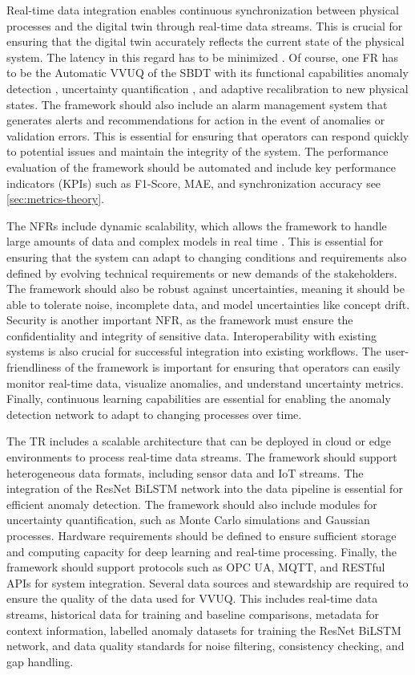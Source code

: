 Real-time data integration enables continuous synchronization between physical processes and the digital twin through real-time data streams. This is crucial for ensuring that the digital twin accurately reflects the current state of the physical system. The latency in this regard has to be minimized \autocite{li2018learning}. Of course, one FR has to be the Automatic VVUQ of the SBDT with its functional capabilities anomaly detection \autocite{pang2021deep}, uncertainty quantification \autocite{sel2025survey}, and adaptive recalibration to new physical states. The framework should also include an alarm management system that generates alerts and recommendations for action in the event of anomalies or validation errors. This is essential for ensuring that operators can respond quickly to potential issues and maintain the integrity of the system. The performance evaluation of the framework should be automated and include key performance indicators (KPIs) such as F1-Score, MAE, and synchronization accuracy see \autoref{sec:metrics-theory}.

The NFRs include dynamic scalability, which allows the framework to handle large amounts of data and complex models in real time \autocite{leskovec2020mining}. This is essential for ensuring that the system can adapt to changing conditions and requirements also defined by evolving technical requirements or new demands of the stakeholders. The framework should also be robust against uncertainties, meaning it should be able to tolerate noise, incomplete data, and model uncertainties like concept drift. Security is another important NFR, as the framework must ensure the confidentiality and integrity of sensitive data. Interoperability with existing systems is also crucial for successful integration into existing workflows. The user-friendliness of the framework is important for ensuring that operators can easily monitor real-time data, visualize anomalies, and understand uncertainty metrics. Finally, continuous learning capabilities are essential for enabling the anomaly detection network to adapt to changing processes over time.

The TR includes a scalable architecture that can be deployed in cloud or edge environments to process real-time data streams. The framework should support heterogeneous data formats, including sensor data and IoT streams. The integration of the ResNet BiLSTM network into the data pipeline is essential for efficient anomaly detection. The framework should also include modules for uncertainty quantification, such as Monte Carlo simulations and Gaussian processes. Hardware requirements should be defined to ensure sufficient storage and computing capacity for deep learning and real-time processing. Finally, the framework should support protocols such as OPC UA, MQTT, and RESTful APIs for system integration. Several data sources and stewardship are required to ensure the quality of the data used for VVUQ. This includes real-time data streams, historical data for training and baseline comparisons, metadata for context information, labelled anomaly datasets for training the ResNet BiLSTM network, and data quality standards for noise filtering, consistency checking, and gap handling.

